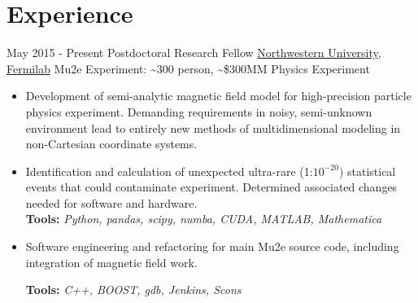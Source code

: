 \documentclass[letterpaper]{twentysecondcv} %
\begin{document}
\makeprofile %


\section{Experience}

\begin{twenty} %
\twentyitem
    	{May 2015 -}
		{Present}
        {Postdoctoral Research Fellow}
        {\href{https://www.physics.northwestern.edu/}{Northwestern University}, \href{http://www.fnal.gov/}{Fermilab}}
        {Mu2e Experiment: \textasciitilde300 person, \textasciitilde\$300MM Physics Experiment}
        {\begin{itemize}
        \vspace{-3mm}
        \item Development of semi-analytic magnetic field model for high-precision particle physics experiment.  Demanding requirements in noisy, semi-unknown environment lead to entirely new methods of multidimensional modeling in non-Cartesian coordinate systems.
        \item Identification and calculation of unexpected ultra-rare (1:$10^{-20}$) statistical events that could contaminate experiment. Determined associated changes needed for software and hardware.\\
        \textbf{Tools:} \textit{Python, pandas, scipy, numba, CUDA, MATLAB, Mathematica}
        
        \item Software engineering and refactoring for main Mu2e source code, including integration of magnetic field work.
        
        \textbf{Tools:} \textit{C++, BOOST, gdb, Jenkins, Scons}
                         

\end{itemize}}
\end{twenty}
\end{document}
